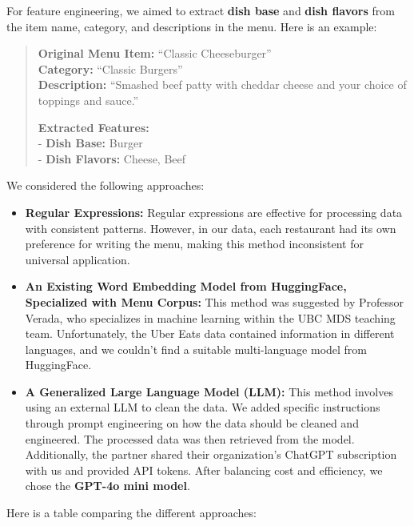 \documentclass[
  11pt,
  a4paper,
  DIV=11,
  numbers=noendperiod]{scrartcl}
\providecommand{\tightlist}{%
  \setlength{\itemsep}{0pt}\setlength{\parskip}{0pt}}\usepackage{longtable,booktabs,array}
\begin{document}
For feature engineering, we aimed to extract \textbf{dish base} and
\textbf{dish flavors} from the item name, category, and descriptions in
the menu. Here is an example:

\begin{quote}
\textbf{Original Menu Item:} ``Classic Cheeseburger''\\
\textbf{Category:} ``Classic Burgers''\\
\textbf{Description:} ``Smashed beef patty with cheddar cheese and your
choice of toppings and sauce.''

\textbf{Extracted Features:}\\
- \textbf{Dish Base:} Burger\\
- \textbf{Dish Flavors:} Cheese, Beef
\end{quote}

We considered the following approaches:

\begin{itemize}
\tightlist
\item
  \textbf{Regular Expressions:} Regular expressions are effective for
  processing data with consistent patterns. However, in our data, each
  restaurant had its own preference for writing the menu, making this
  method inconsistent for universal application.
\item
  \textbf{An Existing Word Embedding Model from HuggingFace, Specialized
  with Menu Corpus:} This method was suggested by Professor Verada, who
  specializes in machine learning within the UBC MDS teaching team.
  Unfortunately, the Uber Eats data contained information in different
  languages, and we couldn't find a suitable multi-language model from
  HuggingFace.
\item
  \textbf{A Generalized Large Language Model (LLM):} This method
  involves using an external LLM to clean the data. We added specific
  instructions through prompt engineering on how the data should be
  cleaned and engineered. The processed data was then retrieved from the
  model. Additionally, the partner shared their organization's ChatGPT
  subscription with us and provided API tokens. After balancing cost and
  efficiency, we chose the \textbf{GPT-4o mini model}.
\end{itemize}

Here is a table comparing the different approaches:
\end{document}
